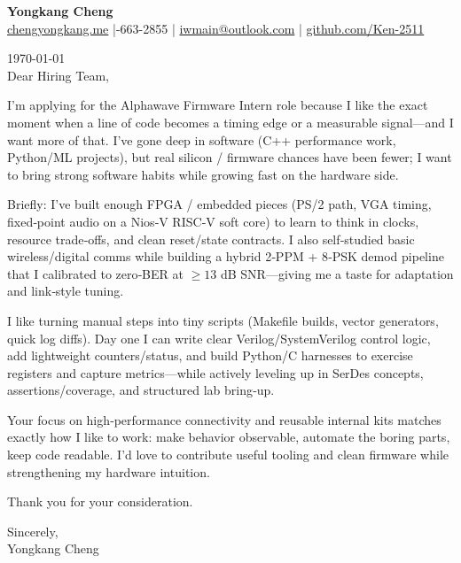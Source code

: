 \documentclass[11pt]{article}
\begin{document}
{\Large \textbf{Yongkang Cheng}}\\[2pt]
\href{https://chengyongkang.me/}{chengyongkang.me} \;|-663-2855 \;|\; \href{mailto:iwmain@outlook.com}{iwmain@outlook.com} \;|\; \href{https://github.com/Ken-2511}{github.com/Ken-2511}

\today\\[0.8em]

Dear Hiring Team,

I’m applying for the Alphawave Firmware Intern role because I like the exact moment when a line of code becomes a timing edge or a measurable signal—and I want more of that. I’ve gone deep in software (C++ performance work, Python/ML projects), but real silicon / firmware chances have been fewer; I want to bring strong software habits while growing fast on the hardware side.

Briefly: I’ve built enough FPGA / embedded pieces (PS/2 path, VGA timing, fixed‑point audio on a Nios‑V RISC‑V soft core) to learn to think in clocks, resource trade‑offs, and clean reset/state contracts. I also self‑studied basic wireless/digital comms while building a hybrid 2‑PPM + 8‑PSK demod pipeline that I calibrated to zero‑BER at $\geq 13$ dB SNR—giving me a taste for adaptation and link‑style tuning.

I like turning manual steps into tiny scripts (Makefile builds, vector generators, quick log diffs). Day one I can write clear Verilog/SystemVerilog control logic, add lightweight counters/status, and build Python/C harnesses to exercise registers and capture metrics—while actively leveling up in SerDes concepts, assertions/coverage, and structured lab bring‑up.

Your focus on high‑performance connectivity and reusable internal kits matches exactly how I like to work: make behavior observable, automate the boring parts, keep code readable. I’d love to contribute useful tooling and clean firmware while strengthening my hardware intuition.

Thank you for your consideration.

\vspace{1em}
Sincerely,\\[1.2em]
Yongkang Cheng
\end{document}
